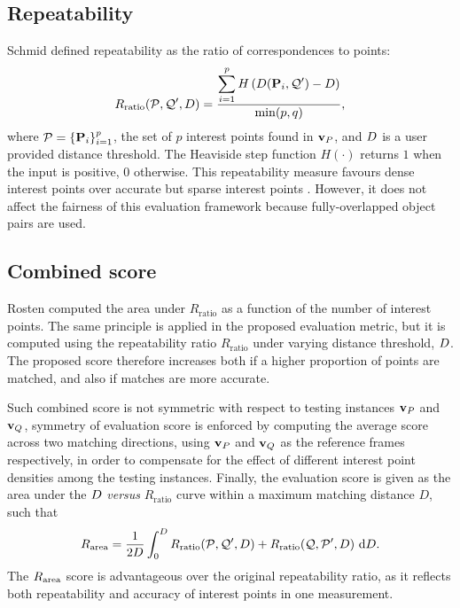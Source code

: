 \subsection{Repeatability}
Schmid \etal \cite{Schmid2000} defined repeatability as the ratio of correspondences to points:
\begin{equation}
R_\textrm{ratio}(\mathcal{P}, \mathcal{Q}', D) = \frac{\displaystyle\sum_{i=1}^p H\left(D(\mathbf{P}_i, \mathcal{Q}') - D\right)}{\min(p, q)},
\label{eqn/eval/repeatratio}
\end{equation}
where $\mathcal{P} = \{\mathbf{P}_i\}_{i=1}^{p}$, the set of $p$ interest points found in $\mathbf{v}_P$, and $D$ is a user provided distance threshold. 
The Heaviside step function $H(\cdot)$ returns $1$ when the input is positive, $0$ otherwise.
This repeatability measure favours dense interest points over accurate but sparse interest points \cite{Willis2009}. 
However, it does not affect the fairness of this evaluation framework because fully-overlapped object pairs are used.

\subsection{Combined score}
Rosten \etal \cite{Rosten2010} computed the area under $R_\textrm{ratio}$ as a function of the number of interest points. 
The same principle is applied in the proposed evaluation metric, but it is computed using the repeatability ratio $R_\textrm{ratio}$ under varying distance threshold, $D$.  
The proposed score therefore increases both if a higher proportion of points are matched, and also if matches are more accurate. 

Such combined score is not symmetric with respect to testing instances $\mathbf{v}_P$ and $\mathbf{v}_Q$, symmetry of evaluation score is enforced by computing the average score across two matching directions, using $\mathbf{v}_P$ and $\mathbf{v}_Q$ as the reference frames respectively, in order to compensate for the effect of different interest point densities among the testing instances. Finally, the evaluation score is given as the area under the $D$ \textit{versus} $R_\textrm{ratio}$ curve within a maximum matching distance $D$, such that  
\begin{equation}
R_\textrm{area}=\frac{1}{2D}\int_{0}^{D}R_\textrm{ratio}(\mathcal{P}, \mathcal{Q}', D) + R_\textrm{ratio}(\mathcal{Q}, \mathcal{P}', D) ~ \textrm{d}D.
\label{eqn/eval/rptarea}
\end{equation}
The $R_\textrm{area}$ score is advantageous over the original repeatability ratio, as it reflects both repeatability and accuracy of interest points in one measurement. 

